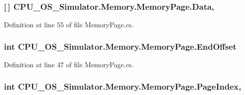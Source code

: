 \subsubsection[{Data}]{ \mbox{[}$\,$\mbox{]} C\+P\+U\+\_\+\+O\+S\+\_\+\+Simulator.\+Memory.\+Memory\+Page.\+Data\hspace{0.3cm}{\ttfamily [get]}, {\ttfamily [set]}}\label{class_c_p_u___o_s___simulator_1_1_memory_1_1_memory_page_a8bf84e82146f9ff35ffbcc32b93a9db0}


Definition at line 55 of file Memory\+Page.\+cs.

\hypertarget{class_c_p_u___o_s___simulator_1_1_memory_1_1_memory_page_abe850b4a088a820ecf598af1cd9a7deb}{}
\subsubsection[{End\+Offset}]{\setlength{\rightskip}{0pt plus 5cm}int C\+P\+U\+\_\+\+O\+S\+\_\+\+Simulator.\+Memory.\+Memory\+Page.\+End\+Offset\hspace{0.3cm}{\ttfamily [get]}}\label{class_c_p_u___o_s___simulator_1_1_memory_1_1_memory_page_abe850b4a088a820ecf598af1cd9a7deb}


Definition at line 47 of file Memory\+Page.\+cs.

\hypertarget{class_c_p_u___o_s___simulator_1_1_memory_1_1_memory_page_aec80700d036a447e7e6ec204513e3a59}{}
\subsubsection[{Page\+Index}]{\setlength{\rightskip}{0pt plus 5cm}int C\+P\+U\+\_\+\+O\+S\+\_\+\+Simulator.\+Memory.\+Memory\+Page.\+Page\+Index\hspace{0.3cm}{\ttfamily [get]}, {\ttfamily [set]}}\label{class_c_p_u___o_s___simulator_1_1_memory_1_1_memory_page_aec80700d036a447e7e6ec204513e3a59}


